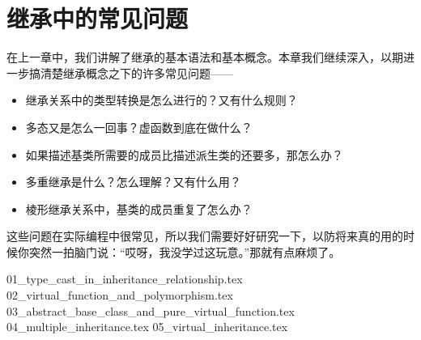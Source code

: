 \chapter{继承中的常见问题}
在上一章中，我们讲解了继承的基本语法和基本概念。本章我们继续深入，以期进一步搞清楚继承概念之下的许多常见问题——
\begin{itemize}
    \item 继承关系中的类型转换是怎么进行的？又有什么规则？\par
    \item 多态又是怎么一回事？虚函数到底在做什么？\par
    \item 如果描述基类所需要的成员比描述派生类的还要多，那怎么办？\par
    \item 多重继承是什么？怎么理解？又有什么用？\par
    \item 棱形继承关系中，基类的成员重复了怎么办？\par
\end{itemize}
这些问题在实际编程中很常见，所以我们需要好好研究一下，以防将来真的用的时候你突然一拍脑门说：``哎呀，我没学过这玩意。''那就有点麻烦了。\par
{01_type_cast_in_inheritance_relationship.tex}
{02_virtual_function_and_polymorphism.tex}
{03_abstract_base_class_and_pure_virtual_function.tex}
{04_multiple_inheritance.tex}
{05_virtual_inheritance.tex}
